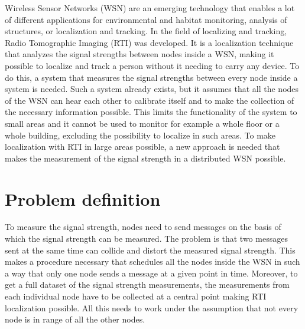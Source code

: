 

Wireless Sensor Networks (WSN) are an emerging technology that enables a lot of different applications for environmental and habitat monitoring, analysis of structures, or localization and tracking. In the field of localizing and tracking, Radio Tomographic Imaging (RTI) was developed. It is a localization technique that analyzes the signal strengths between nodes inside a WSN, making it possible to localize and track a person without it needing to carry any device. To do this, a system that measures the signal strengths between every node inside a system is needed. Such a system already exists, but it assumes that all the nodes of the WSN can hear each other to calibrate itself and to make the collection of the necessary information possible. This limits the functionality of the system to small areas and it cannot be used to monitor for example a whole floor or a whole building, excluding the possibility to localize in such areas. To make localization with RTI in large areas possible, a new approach is needed that makes the measurement of the signal strength in a distributed WSN possible. 

\section{Problem definition}
To measure the signal strength, nodes need to send messages on the basis of which the signal strength can be measured. The problem is that two messages sent at the same time can collide and distort the measured signal strength. This makes a procedure necessary that schedules all the nodes inside the WSN in such a way that only one node sends a message at a given point in time. Moreover, to get a full dataset of the signal strength measurements, the measurements from each individual node have to be collected at a central point making RTI localization possible. All this needs to work under the assumption that not every node is in range of all the other nodes.

